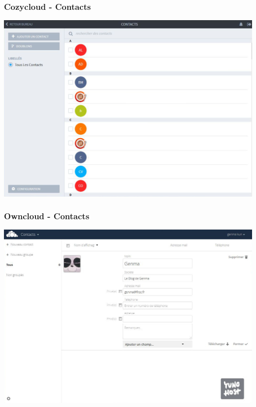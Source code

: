 \documentclass{beamer}
\begin{document}
\begin{frame}
\frametitle{Cozycloud - Contacts}
\includegraphics[scale=0.3] {./CozyCloud/CozyCloud_Contacts.jpg}
\end{frame}

\begin{frame}
\frametitle{Owncloud - Contacts}
\includegraphics[scale=0.3] {./Owncloud/Owncloud_Contacts.jpg}
\end{frame}
\end{document}
